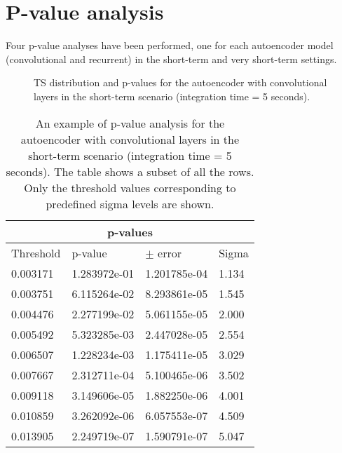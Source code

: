 \section{P-value analysis}
\label{s:appendix-a}
Four p-value analyses have been performed, one for each autoencoder model (convolutional and recurrent) in the short-term and very short-term settings.

\newpage

\begin{figure}[!h]
    \centering
    \begin{minipage}{0.5\textwidth}
        \centering
        
    \end{minipage}%
    \begin{minipage}{0.5\textwidth}
       \centering
       
    \end{minipage}
    \captionsetup{width=0.9\linewidth}
    \caption{TS distribution and p-values for the autoencoder with convolutional layers in the short-term scenario (integration time = 5 seconds).}
    \label{fig:ts-distribution-and-p-values-cnn-it-5-appendix}
\end{figure}

\begin{table}[!h]
\centering
\begin{tabular}{|p{3cm}|p{3cm}|p{3cm}|p{3cm}|}
\hline
\multicolumn{4}{|c|}{p-values} \\
\hline
Threshold & p-value & $\pm$ error &  Sigma \\
\hline
0.003171 & 1.283972e-01 & 1.201785e-04 & 1.134 \\
0.003751 & 6.115264e-02 & 8.293861e-05 & 1.545 \\
0.004476 & 2.277199e-02 & 5.061155e-05 & 2.000 \\
0.005492 & 5.323285e-03 & 2.447028e-05 & 2.554 \\
0.006507 & 1.228234e-03 & 1.175411e-05 & 3.029 \\
0.007667 & 2.312711e-04 & 5.100465e-06 & 3.502 \\
0.009118 & 3.149606e-05 & 1.882250e-06 & 4.001 \\
0.010859 & 3.262092e-06 & 6.057553e-07 & 4.509 \\
0.013905 & 2.249719e-07 & 1.590791e-07 & 5.047 \\
\hline
\end{tabular}
\caption{An example of p-value analysis for the autoencoder with convolutional layers in the short-term scenario (integration time = 5 seconds). The table shows a subset of all the rows. Only the threshold values corresponding to predefined sigma levels are shown.}
\label{tab:p-value-table-cnn-itime-5-appendix}
\end{table}




